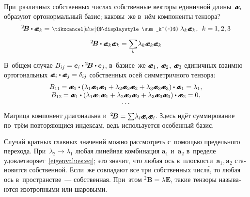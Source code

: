 \begin{otherlanguage}{russian}
\vspace{-0.64em} При~различных собственных числах собственные векторы единичной длины~${\mathboldae_i}$ образуют ортонормальный базис; каковы~же в~нём компоненты тензора?
\vspace{0.2em}\[\begin{array}{c}
{^2\!\bm{B}} \dotp \mathboldae_k = \hspace{0.2ex} \scalebox{0.8}[0.8]{$\tikzcancel[blue]{$\displaystyle\sum_k^{~}$}$}\: \lambda_k \mathboldae_k \hspace{0.1ex}, \:\: k =\hspace{-0.1ex} 1, 2, 3 \\[.9em]
%
{^2\!\bm{B}} \dotp \tikzmark{BeginEqualsEBrace} {\mathboldae_k \mathboldae_k} \tikzmark{EndEqualsEBrace} = \scalebox{0.9}[0.9]{$\displaystyle \sum_{\smash{k}}$} \hspace{0.1ex} \lambda_k \mathboldae_k \mathboldae_k
\end{array}\]

\vspace{-0.25em} В~общем случае ${B_{ij} = \bm{e}_i \dotp {^2\!\bm{B}} \dotp \bm{e}_j}$, в~базисе~же ${\mathboldae_1}$, ${\mathboldae_2}$, ${\mathboldae_3}$ единичных взаимно ортогональных ${\mathboldae_i \dotp \mathboldae_j = \delta_{ij}}$ собственных осей симметричного тензора:
\[\begin{array}{c}
B_{11} \hspace{-0.12ex} = \mathboldae_1 \dotp \left({\lambda_1 \mathboldae_1 \mathboldae_1 + \lambda_2 \mathboldae_2 \mathboldae_2 + \lambda_3 \mathboldae_3 \mathboldae_3}\right) \dotp \mathboldae_1 = \lambda_1, \\
B_{12} \hspace{-0.12ex} = \mathboldae_1 \dotp \left({\lambda_1 \mathboldae_1 \mathboldae_1 + \lambda_2 \mathboldae_2 \mathboldae_2 + \lambda_3 \mathboldae_3 \mathboldae_3}\right) \dotp \mathboldae_2 = 0 \hspace{0.1ex}, \\[-0.2em]
\ldots
\end{array}\]
\noindent Матрица компонент диагональна и~${{^2\!\bm{B}} = \sum\! \lambda_i \mathboldae_i \mathboldae_i}$. Здесь идёт суммирование по~трём повторяющися индексам, %
ведь используется особенный базис.

Случай кратных главных значений можно рассмотреть с~помощью предельного перехода. При~${\lambda_2 \to \lambda_1}$ любая линейная комбинация ${\bm{a}_1}$ и~${\bm{a}_2}$ в~пределе удовлетворяет~\eqref{eigenvalues:eq}; это значит, что любая ось в~плоскости~${\bm{a}_1, \bm{a}_2}$ становится собственной. Если~же совпадают все три собственных числ\'{а}, то любая ось в~пространстве~--- собственная. При~этом ${{^2\!\bm{B}} = \lambda \bm{E}}$, такие тензоры называются изотропными или шаровыми.

\end{otherlanguage}

